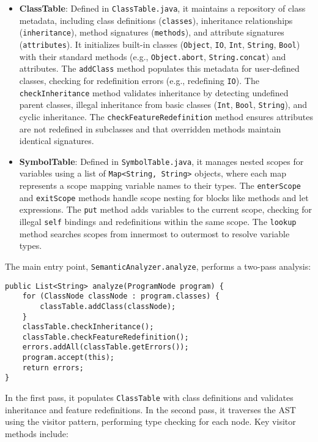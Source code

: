 \documentclass[11pt, titlepage]{article}
\begin{document}
\begin{itemize}[leftmargin=*]
    \item \textbf{ClassTable}: Defined in \texttt{ClassTable.java}, it maintains a repository of class metadata, including class definitions (\texttt{classes}), inheritance relationships (\texttt{inheritance}), method signatures (\texttt{methods}), and attribute signatures (\texttt{attributes}). It initializes built-in classes (\texttt{Object}, \texttt{IO}, \texttt{Int}, \texttt{String}, \texttt{Bool}) with their standard methods (e.g., \texttt{Object.abort}, \texttt{String.concat}) and attributes. The \texttt{addClass} method populates this metadata for user-defined classes, checking for redefinition errors (e.g., redefining \texttt{IO}). The \texttt{checkInheritance} method validates inheritance by detecting undefined parent classes, illegal inheritance from basic classes (\texttt{Int}, \texttt{Bool}, \texttt{String}), and cyclic inheritance. The \texttt{checkFeatureRedefinition} method ensures attributes are not redefined in subclasses and that overridden methods maintain identical signatures.

    \item \textbf{SymbolTable}: Defined in \texttt{SymbolTable.java}, it manages nested scopes for variables using a list of \texttt{Map<String, String>} objects, where each map represents a scope mapping variable names to their types. The \texttt{enterScope} and \texttt{exitScope} methods handle scope nesting for blocks like methods and let expressions. The \texttt{put} method adds variables to the current scope, checking for illegal \texttt{self} bindings and redefinitions within the same scope. The \texttt{lookup} method searches scopes from innermost to outermost to resolve variable types.

\end{itemize}

The main entry point, \texttt{SemanticAnalyzer.analyze}, performs a two-pass analysis:
\begin{lstlisting}
public List<String> analyze(ProgramNode program) {
    for (ClassNode classNode : program.classes) {
        classTable.addClass(classNode);
    }
    classTable.checkInheritance();
    classTable.checkFeatureRedefinition();
    errors.addAll(classTable.getErrors());
    program.accept(this);
    return errors;
}
\end{lstlisting}

In the first pass, it populates \texttt{ClassTable} with class definitions and validates inheritance and feature redefinitions. In the second pass, it traverses the AST using the visitor pattern, performing type checking for each node. Key visitor methods include:
\end{document}

